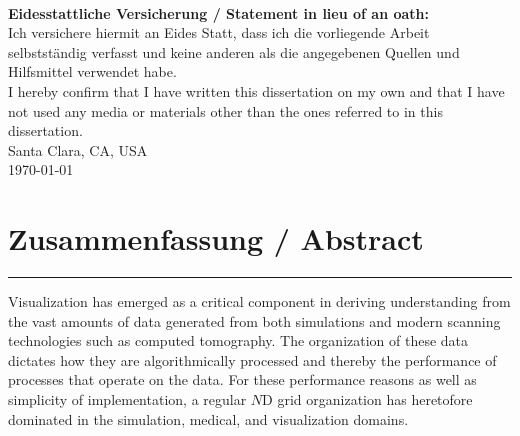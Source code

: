 %
%

\clearpage
\thispagestyle{empty}
~
\begin{flushleft}
  \textbf{Eidesstattliche Versicherung / Statement in lieu of an oath:}\\
  Ich versichere hiermit an Eides Statt, dass ich die vorliegende
  Arbeit selbstst\"andig verfasst und keine anderen als die angegebenen
  Quellen und Hilfsmittel verwendet habe.\\

  I hereby confirm that I have written this dissertation on my own
  and that I have not used any media or materials other than the ones
  referred to in this dissertation.\\[\baselineskip]

	Santa Clara, CA, USA\\
	\today{}\\%

\end{flushleft}

\clearpage

\section*{Zusammenfassung / Abstract}


\vspace{1em}

\hrule{}
\vspace{1em}

Visualization has emerged as a critical component in deriving
understanding from the vast amounts of data generated from both
simulations and modern scanning technologies such as computed
tomography.  The organization of these data dictates how they are
algorithmically processed and thereby the performance of processes
that operate on the data.  For these performance reasons as well as
simplicity of implementation, a regular $N$D grid organization has
heretofore dominated in the simulation, medical, and visualization
domains.

